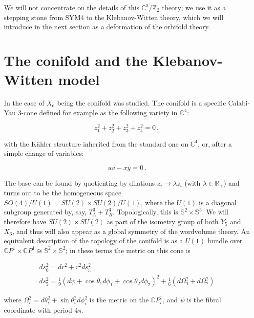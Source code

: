 We will not concentrate on the details of this $\mathbb{C}^3/\mathbb{Z}_2$ theory; we use it as a stepping stone from SYM4 to the Klebanov-Witten theory, which we will introduce in the next section as a deformation of the orbifold theory.

\section{The conifold and the Klebanov-Witten model} \label{sec:KW}

In \cite{KW_SCFT} the case of $X_6$ being the conifold was studied. The conifold is a specific Calabi-Yau 3-cone defined for example as the following variety in $\mathbb{C}^4$:

\begin{equation}
	z_1^2 + z_2^2 + z_3^2 + z_4^2 = 0\,,
\end{equation}

with the K\"ahler structure inherited from the standard one on $\mathbb{C}^4$, or, after a simple change of variables:

\begin{equation}
	u v - xy = 0\,.
	\label{conifoldeq}
\end{equation}

The base can be found by quotienting by dilations $z_i \rightarrow \lambda z_i$ (with $\lambda \in \mathbb{R}_+$) and turns out to be the homogeneous space $SO(4)/U(1) = SU(2)\times SU(2) / U(1)$, where the $U(1)$ is a diagonal subgroup generated by, say, $T^3_L + T^3_R$. Topologically, this is $\mathbb{S}^2 \times \mathbb{S}^3$. We will therefore have $SU(2)\times SU(2)$ as part of the isometry group of both $Y_5$ and $X_6$, and thus will also appear as a global symmetry of the wordvolume theory. An equivalent description of the topology of the conifold is as a $U(1)$ bundle over $\mathbb{C}P^1 \times \mathbb{C}P^1 \cong \mathbb{S}^2 \times \mathbb{S}^2$; in these terms the metric on this cone is

\begin{gather}
	ds^2_6 = dr^2 + r^2 ds^2_5 \nonumber\\
	ds^2_5 = \frac{1}{9} (d\psi + \cos\theta_1 d\phi_1 + \cos\theta_2 d\phi_2)^2 + \frac{1}{6} (d\Omega_1^2 + d\Omega_2^2)\label{conifoldmetric}
\end{gather}

where $\Omega_i^2 = d\theta_i^2 + \sin\theta_i^2 d\phi_i^2$ is the metric on the $\mathbb{C}P^1_i$, and $\psi$ is the fibral coordinate with period $4\pi$.

